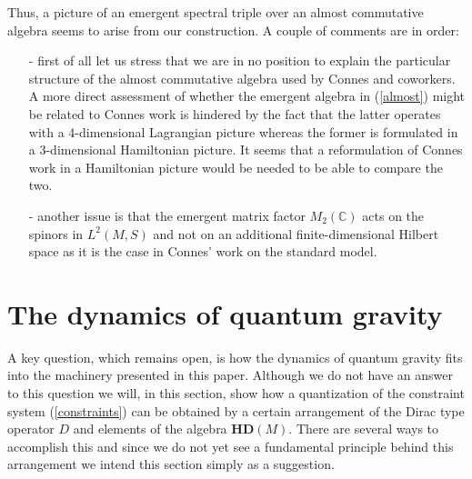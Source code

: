 \documentclass[12pt]{article}
\begin{document}
Thus, a picture of an emergent spectral triple over an almost commutative algebra seems to arise from our construction. 
A couple of comments are in order:
\begin{itemize}
\item[-]
first of all let us stress that we are in no position to explain the particular structure of the almost commutative algebra used by Connes and coworkers. A more direct assessment of whether the emergent algebra in (\ref{almost}) might be related to Connes work is hindered by the fact that the latter operates with a 4-dimensional Lagrangian picture whereas the former is formulated in a 3-dimensional Hamiltonian picture. It seems that a reformulation of Connes work in a Hamiltonian picture would be needed to be able to compare the two.
\item[-]
another issue is that the emergent matrix factor $M_2(\mathbb{C})$ acts on the spinors in $L^2(M,S)$ and not on an additional finite-dimensional Hilbert space as it is the case in Connes' work on the standard model.
\end{itemize}







\section{The dynamics of quantum gravity}

A key question, which remains open, is how the dynamics of quantum gravity fits into the machinery presented in this paper. Although we do not have an answer to this question we will, in this section, show how a quantization of the constraint system (\ref{constraints}) can be obtained by a certain arrangement of the Dirac type operator $D$ and elements of the algebra $\mathbf{HD}(M) $. There are several ways to accomplish this and since we do not yet see a fundamental principle behind this arrangement we intend this section simply as a suggestion.\\
\end{document}
